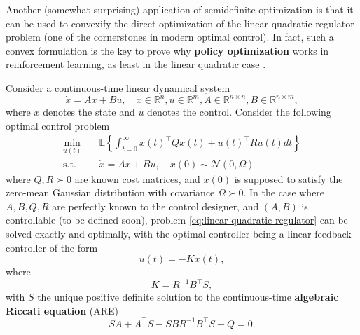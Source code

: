 \documentclass[
]{book}
\theoremstyle{definition}
\theoremstyle{definition}
\theoremstyle{definition}
\theoremstyle{definition}
\theoremstyle{remark}
\begin{document}
Another (somewhat surprising) application of semidefinite optimization is that it can be used to convexify the direct optimization of the linear quadratic regulator problem (one of the cornerstones in modern optimal control). In fact, such a convex formulation is the key to prove why \textbf{policy optimization} works in reinforcement learning, as least in the linear quadratic case \citep{hu23review-toward} \citep{mohammadi21tac-convergence}.

Consider a continuous-time linear dynamical system
\begin{equation}
\dot{x} = A x + B u, \quad x \in \mathbb{R}^{n}, u \in \mathbb{R}^{m}, A \in \mathbb{R}^{n \times n}, B \in \mathbb{R}^{n \times m},
\label{eq:ct-linear-dynamical}
\end{equation}
where \(x\) denotes the state and \(u\) denotes the control. Consider the following optimal control problem
\begin{equation}
\begin{split}
\min_{u(t)}  & \quad \mathbb{E} \left\{  \int_{t=0}^{\infty} x(t)^\top Q x(t) + u(t)^\top R u(t) dt  \right\}  \\
\mathrm{s.t.}& \quad \dot{x} = A x + Bu, \quad x(0) \sim \mathcal{N}(0,\Omega)
\end{split}
\label{eq:linear-quadratic-regulator}
\end{equation}
where \(Q,R\succ 0\) are known cost matrices, and \(x(0)\) is supposed to satisfy the zero-mean Gaussian distribution with covariance \(\Omega \succ 0\). In the case where \(A,B,Q,R\) are perfectly known to the control designer, and \((A,B)\) is controllable (to be defined soon), problem \eqref{eq:linear-quadratic-regulator} can be solved exactly and optimally, with the optimal controller being a linear feedback controller of the form
\[
u(t) = -Kx(t),
\]
where
\[
K = R^{-1}B^\top S,
\]
with \(S\) the unique positive definite solution to the continuous-time \textbf{algebraic Riccati equation} (ARE)
\[
SA + A^\top S - SBR^{-1}B^\top S + Q = 0.
\]
\end{document}
